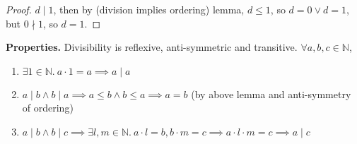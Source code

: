 \documentclass[12pt]{article}
\numberwithin{equation}{dummy}
\theoremstyle{definition}
\newcommand{\nat}{\mathbb{N}}
\begin{document}
\begin{proof}
    $d\mid 1$, then by (division implies ordering) lemma, $d\leq 1$, so $d=0 \lor d=1$, but $0 \nmid 1$, so $d=1$.
\end{proof}
\textbf{Properties.} Divisibility is reflexive, anti-symmetric and transitive. $\forall a,b,c\in\nat$,
\begin{enumerate}
    \item $\exists 1 \in\nat.~ a\cdot 1 =a \implies a\mid a$
    \item $a\mid b \land b\mid a \implies a\leq b \land b\leq a \implies a = b$ (by above lemma and anti-symmetry of ordering)
    \item $a\mid b \land b\mid c \implies \exists l,m\in \nat.~ a\cdot l=b, b\cdot m=c
        \implies a\cdot l\cdot m = c \implies a\mid c$
\end{enumerate}
\end{document}
